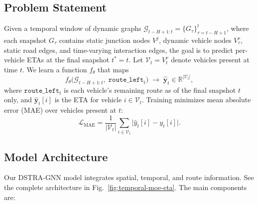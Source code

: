 \subsection{Problem Statement}
Given a temporal window of dynamic graphs $\mathcal{G}_{t-H+1:t}=\{G_{\tau}\}_{\tau=t-H+1}^{t}$, where each snapshot $G_{\tau}$ contains static junction nodes $V^{j}$, dynamic vehicle nodes $V^{v}_{\tau}$, static road edges, and time-varying interaction edges, the goal is to predict per-vehicle ETAs at the final snapshot $t^*{=}t$. Let $\mathcal{V}_t = V^{v}_{t}$ denote vehicles present at time $t$. We learn a function $f_{\theta}$ that maps
\begin{equation}
f_{\theta}\big(\mathcal{G}_{t-H+1:t},\;\texttt{route\_left}_t\big) \;\to\; \hat{\mathbf{y}}_t \in \mathbb{R}^{|\mathcal{V}_t|},
\end{equation}
where $\texttt{route\_left}_t$ is each vehicle's remaining route as of the final snapshot $t$ only, and $\hat{\mathbf{y}}_t[i]$ is the ETA for vehicle $i\in\mathcal{V}_t$. Training minimizes mean absolute error (MAE) over vehicles present at $t$:
\begin{equation}
\mathcal{L}_{\text{MAE}} = \frac{1}{|\mathcal{V}_t|}\sum_{i\in\mathcal{V}_t} \big| \hat{y}_t[i] - y_t[i] \big|.
\end{equation}

\subsection{Model Architecture}
Our DSTRA-GNN model integrates spatial, temporal, and route information. See the complete architecture in Fig.~\ref{fig:temporal-moe-eta}. The main components are:


